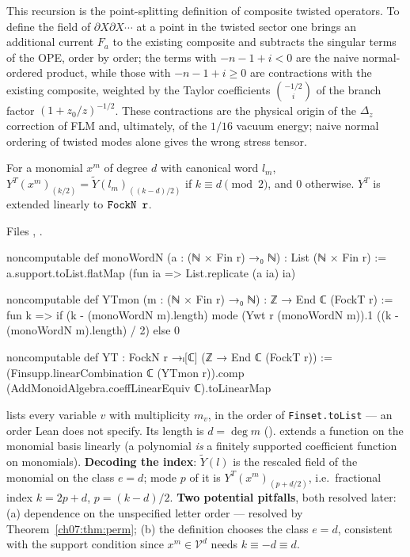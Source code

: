 \begin{physics}
This recursion is the point-splitting definition of composite twisted operators. To define the field of $\partial X\partial X\cdots$ at a point in the twisted sector one brings an additional current $F_a$ to the existing composite and subtracts the singular terms of the OPE, order by order; the terms with $-n-1+i<0$ are the naive normal-ordered product, while those with $-n-1+i\ge0$ are contractions with the existing composite, weighted by the Taylor coefficients $\binom{-1/2}{i}$ of the branch factor $(1+z_0/z)^{-1/2}$. These contractions are the physical origin of the $\Delta_z$ correction of FLM and, ultimately, of the $1/16$ vacuum energy; naive normal ordering of twisted modes alone gives the wrong stress tensor.
\end{physics}

\begin{definition}\label{ch07:def:YT}
For a monomial $x^m$ of degree $d$ with canonical word $l_m$,
$Y^T(x^m)_{(k/2)} = \widetilde Y(l_m)_{((k-d)/2)}$ if $k\equiv d\pmod2$, and $0$ otherwise.
$Y^T$ is extended linearly to $\lean{FockN r}$.
\end{definition}

\noindent Files , .
\begin{leancode}
noncomputable def monoWordN (a : (ℕ × Fin r) →₀ ℕ) : List (ℕ × Fin r) :=
  a.support.toList.flatMap (fun ia => List.replicate (a ia) ia)

noncomputable def YTmon (m : (ℕ × Fin r) →₀ ℕ) : ℤ → End ℂ (FockT r) := fun k =>
  if (k - (monoWordN m).length) %
    mode (Ywt r (monoWordN m)).1 ((k - (monoWordN m).length) / 2)
  else 0

noncomputable def YT : FockN r →ₗ[ℂ] (ℤ → End ℂ (FockT r)) :=
  (Finsupp.linearCombination ℂ (YTmon r)).comp (AddMonoidAlgebra.coeffLinearEquiv ℂ).toLinearMap
\end{leancode}

\begin{dictionary}
 lists every variable $v$ with multiplicity $m_v$, in the order of
\verb|Finset.toList| --- an order Lean does not specify. Its length is $d = \deg m$
().  extends a function on the monomial
basis linearly (a polynomial \emph{is} a finitely supported coefficient function on monomials).
\textbf{Decoding the index}: $\widetilde Y(l)$ is the rescaled field of the monomial on the class
$e = d$; mode $p$ of it is $Y^T(x^m)_{(p+d/2)}$, i.e.\ fractional index $k = 2p+d$, $p = (k-d)/2$.
\textbf{Two potential pitfalls}, both resolved later: (a) dependence on the unspecified letter
order --- resolved by Theorem~\ref{ch07:thm:perm}; (b) the definition chooses the class $e=d$,
consistent with the support condition since $x^m\in\mathcal V^d$ needs $k\equiv -d\equiv d$.
\end{dictionary}


